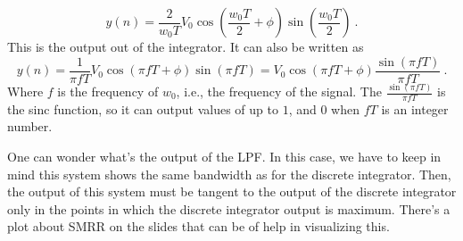 \begin{equation} \label{eq:good}
   y(n) = \frac{2}{w_0 T} V_0 \cos(\frac{w_0 T}{2} + \phi) \sin\left(\frac{w_0 T}{2}\right) \ .
\end{equation}
\noindent This is the output out of the integrator. It can also be written as
\begin{equation}
   y(n) = \frac{1}{\pi f T} V_0 \cos(\pi f T + \phi) \sin\left( \pi f T \right) = V_0 \cos(\pi f T + \phi) \frac{\sin(\pi f T)}{\pi f T} \ .
\end{equation}
\noindent Where $f$ is the frequency of $w_0$, i.e., the frequency of the signal. The $\frac{\sin(\pi f T)}{\pi f T}$ is the sinc function, so it can output values of up to $1$, and $0$ when $fT$ is an integer number.

\noindent One can wonder what's the output of the LPF. In this case, we have to keep in mind this system shows the same bandwidth as for the discrete integrator. Then, the output of this system must be tangent to the output of the discrete integrator only in the points in which the discrete integrator output is maximum. There's a plot about SMRR on the slides that can be of help in visualizing this.

